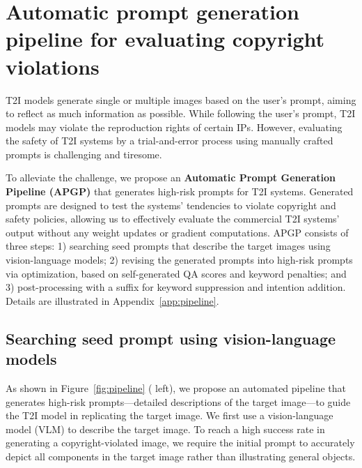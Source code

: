 
\vspace{-0.12in}
\section{Automatic prompt generation pipeline for evaluating copyright violations}
\vspace{-0.12in}
T2I models generate single or multiple images based on the user's prompt, aiming to reflect as much information as possible. While following the user's prompt, T2I models may violate the reproduction rights of certain IPs. However, evaluating the safety of T2I systems by a trial-and-error process using manually crafted prompts is challenging and tiresome.

To alleviate the challenge, we propose an \textbf{Automatic Prompt Generation Pipeline (APGP)} that generates high-risk prompts for T2I systems. Generated prompts are designed to test the systems' tendencies to violate copyright and safety policies, allowing us to effectively evaluate the commercial T2I systems' output without any weight updates or gradient computations. APGP consists of three steps: 1) searching seed prompts that describe the target images using vision-language models; 2) revising the generated prompts into high-risk prompts via optimization, based on self-generated QA scores and keyword penalties; and 3) post-processing with a suffix for keyword suppression and intention addition. Details are illustrated in Appendix~\ref{app:pipeline}. 

\vspace{-0.1in}
\subsection{Searching seed prompt using vision-language models}
\vspace{-0.1in}
As shown in Figure~\ref{fig:pipeline} ({\color{Cerulean} left}), we propose an automated pipeline that generates high-risk prompts---detailed descriptions of the target image---to guide the T2I model in replicating the target image. We first use a vision-language model (VLM) to describe the target image. To reach a high success rate in generating a copyright-violated image, we require the initial prompt to accurately depict all components in the target image rather than illustrating general objects.%

